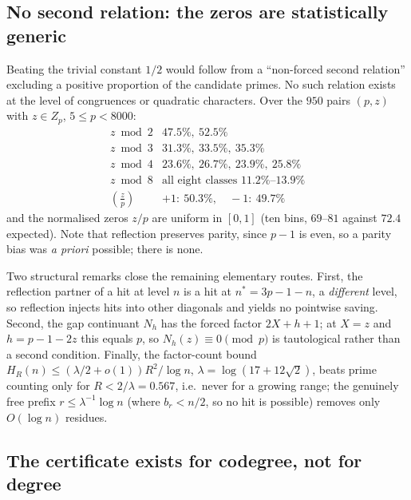 \subsection{No second relation: the zeros are statistically generic}
\label{subsec:generic}

Beating the trivial constant $1/2$ would follow from a ``non-forced second relation''
excluding a positive proportion of the candidate primes.  No such relation exists at the level
of congruences or quadratic characters.  Over the $950$ pairs $(p,z)$ with $z\in Z_p$,
$5\le p<8000$:
\[
\begin{array}{l|l}
 z\bmod2&47.5\%,\ 52.5\%\\
 z\bmod3&31.3\%,\ 33.5\%,\ 35.3\%\\
 z\bmod4&23.6\%,\ 26.7\%,\ 23.9\%,\ 25.8\%\\
 z\bmod8&\text{all eight classes }11.2\%\text{--}13.9\%\\
 \left(\tfrac zp\right)&+1:\ 50.3\%,\quad -1:\ 49.7\%
\end{array}
\]
and the normalised zeros $z/p$ are uniform in $[0,1]$ (ten bins, $69$--$81$ against $72.4$
expected).  Note that reflection preserves parity, since $p-1$ is even, so a parity bias was
\emph{a priori} possible; there is none.

Two structural remarks close the remaining elementary routes.  First, the reflection partner of
a hit at level $n$ is a hit at $n^*=3p-1-n$, a \emph{different} level, so reflection injects
hits into other diagonals and yields no pointwise saving.  Second, the gap continuant $N_h$ has
the forced factor $2X+h+1$; at $X=z$ and $h=p-1-2z$ this equals $p$, so $N_h(z)\equiv0\pmod p$
is tautological rather than a second condition.  Finally, the factor-count bound
$H_R(n)\le(\lambda/2+o(1))R^2/\log n$, $\lambda=\log(17+12\sqrt2)$, beats prime counting only
for $R<2/\lambda=0.567$, i.e.\ never for a growing range; the genuinely free prefix
$r\le\lambda^{-1}\log n$ (where $b_r<n/2$, so no hit is possible) removes only $O(\log n)$
residues.

\subsection{The certificate exists for codegree, not for degree}
\label{subsec:codegree}

